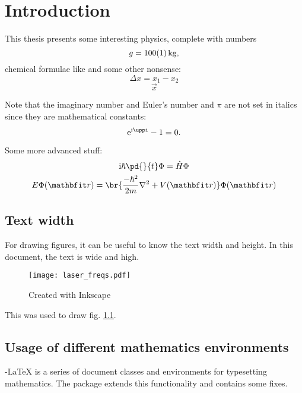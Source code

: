 \chapter{Introduction}\label{ch:introduction}
This thesis presents some interesting physics, complete with numbers
\begin{equation}
	g = \SI{100+-1}{kg}\text{,}
\end{equation}
chemical formulae like  and some other nonsense:
\begin{equation}
	\Delta x = x_1 - x_2
\end{equation}
\begin{equation}
	\vec{x}
\end{equation}

Note that the imaginary number and Euler's number and $\pi$ are not set in italics since they are mathematical constants:
\begin{equation}
	\e^{\i\pi} - 1 = 0\text{.}
\end{equation}

Some more advanced stuff:
\begin{subequations}\label{eq:schroedinger}
	\begin{gather}
		\i \hbar \pd{}{t}\Phi = \op{H}\Phi\\
		E\Phi(\vec{r}) = \br{\frac{-\hbar^2}{2m} \nabla^2 + V(\vec{r}) } \Phi(\vec{r})
	\end{gather}
\end{subequations}

\section{Text width}

For drawing figures, it can be useful to know the text width and height. In this document, the text is \the\textwidth {} wide and \the\textheight {} high.

\begin{figure}[tb]
	\centering
	\texttt{[image: laser\_freqs.pdf]}
	\caption{Created with Inkscape}
	\label{fig:laser_freqs}
\end{figure}


This was used to draw fig. \ref{fig:laser_freqs}.




\section{Usage of different mathematics environments}
 {\AmS}-{\LaTeX} is a series of document classes and environments for typesetting mathematics. The package  extends this functionality and contains some fixes.

